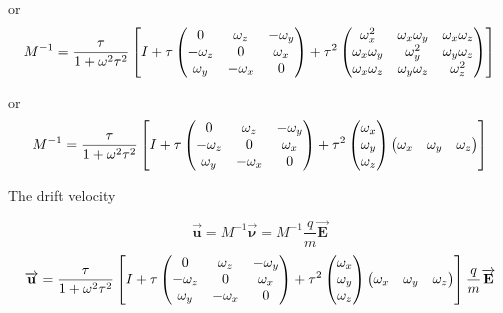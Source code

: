 \documentclass[12pt]{article} %
\begin{document}
or
\begin{equation*} 
 M^{-1} =  \frac{\tau}{1 + \omega^2\tau^2} \left[ I + \tau 
\begin{pmatrix} 
          0  &   \omega_{z} & - \omega_{y} \cr
- \omega_{z} &           0  &   \omega_{x} \cr
  \omega_{y} & - \omega_{x} &           0  \cr           
\end{pmatrix}
+ \tau^2
\begin{pmatrix} 
          \omega_{x}^2   & \omega_{x} \omega_{y}    &  \omega_{x} \omega_{z}  \cr
 \omega_{x} \omega_{y}   &            \omega_{y}^2  &  \omega_{y} \omega_{z}  \cr
 \omega_{x} \omega_{z}   & \omega_{y} \omega_{z}    &           \omega_{z}^2  \cr           
\end{pmatrix}
\right]
\end{equation*}

or
\begin{equation*} 
 M^{-1} =  \frac{\tau}{1 + \omega^2\tau^2} \left[ I + \tau 
\begin{pmatrix} 
          0  &   \omega_{z} & - \omega_{y} \cr
- \omega_{z} &           0  &   \omega_{x} \cr
  \omega_{y} & - \omega_{x} &           0  \cr           
\end{pmatrix}
+ \tau^2
\begin{pmatrix} 
          \omega_{x}  \cr 
          \omega_{y}  \cr  
          \omega_{z}  \cr
\end{pmatrix}
\begin{pmatrix} 
          \omega_{x}   & \omega_{y}    &  \omega_{z}  \cr
\end{pmatrix}
\right]
\end{equation*}


The drift velocity

\begin{equation*} 
 \overrightarrow{\mathbf{u}}= M^{-1} \overrightarrow{\mathbf{\nu}} = M^{-1} \frac{q}{m} \overrightarrow{\mathbf{E}}
\end{equation*}
\begin{equation*} 
 \overrightarrow{\mathbf{u}}=
  \frac{\tau}{1 + \omega^2\tau^2} \left[ I + \tau 
\begin{pmatrix} 
          0  &   \omega_{z} & - \omega_{y} \cr
- \omega_{z} &           0  &   \omega_{x} \cr
  \omega_{y} & - \omega_{x} &           0  \cr           
\end{pmatrix}
+ \tau^2
\begin{pmatrix} 
          \omega_{x}  \cr 
          \omega_{y}  \cr  
          \omega_{z}  \cr
\end{pmatrix}
\begin{pmatrix} 
          \omega_{x}   & \omega_{y}    &  \omega_{z}  \cr
\end{pmatrix}
\right]
\frac{q}{m} \overrightarrow{\mathbf{E}}
\end{equation*}
\end{document}
